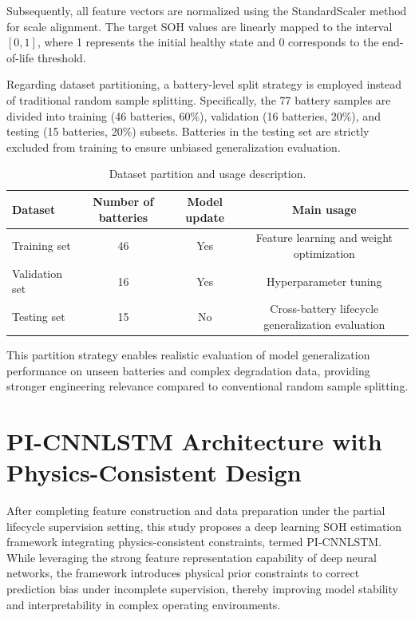 \documentclass[a4paper,fleqn]{cas-dc}
\begin{document}
Subsequently, all feature vectors are normalized using the StandardScaler method for scale alignment. The target SOH values are linearly mapped to the interval $[0,1]$, where 1 represents the initial healthy state and 0 corresponds to the end-of-life threshold.

Regarding dataset partitioning, a battery-level split strategy is employed instead of traditional random sample splitting. Specifically, the 77 battery samples are divided into training (46 batteries, 60\%), validation (16 batteries, 20\%), and testing (15 batteries, 20\%) subsets. Batteries in the testing set are strictly excluded from training to ensure unbiased generalization evaluation.

\begin{table}[pos=htbp]
\centering
\caption{Dataset partition and usage description.}
\label{tab:split}
\begin{tabular*}{\textwidth}{@{\extracolsep{\fill}}lccc@{}}
\toprule
Dataset & Number of batteries & Model update & Main usage \\
\midrule
Training set & 46 & Yes & Feature learning and weight optimization \\
Validation set & 16 & Yes & Hyperparameter tuning \\
Testing set & 15 & No & Cross-battery lifecycle generalization evaluation \\
\bottomrule
\end{tabular*}
\end{table}

This partition strategy enables realistic evaluation of model generalization performance on unseen batteries and complex degradation data, providing stronger engineering relevance compared to conventional random sample splitting.


\section{PI-CNNLSTM Architecture with Physics-Consistent Design}
\label{sec:pi_cnnlstm}

After completing feature construction and data preparation under the partial lifecycle supervision setting, this study proposes a deep learning SOH estimation framework integrating physics-consistent constraints, termed PI-CNNLSTM. While leveraging the strong feature representation capability of deep neural networks, the framework introduces physical prior constraints to correct prediction bias under incomplete supervision, thereby improving model stability and interpretability in complex operating environments.
\end{document}
